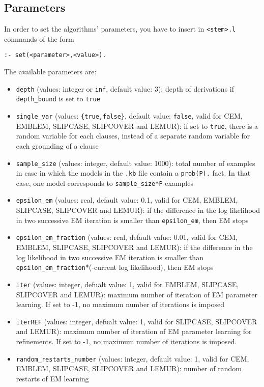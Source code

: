\documentclass[a4paper,10pt]{scrartcl}
\begin{document}
\subsection{Parameters}
In order to set the algorithms' parameters, you have to insert in \texttt{<stem>.l}  commands of the form
\begin{verbatim}
:- set(<parameter>,<value>).
\end{verbatim}
The available parameters are:
\begin{itemize}
\item \verb|depth| (values: integer or \verb|inf|, default value: 3): depth of derivations if  \verb|depth_bound|  is set to \verb|true|
\item \verb|single_var| (values: \verb|{true,false}|, default value: \verb|false|, valid for CEM, EMBLEM, SLIPCASE, SLIPCOVER and LEMUR): if set to \verb|true|, there is a random variable for each clauses, instead of a separate random variable for each grounding of a clause
\item \verb|sample_size| (values: integer, default value: 1000): total number of examples in case in which the models in the \verb|.kb| file contain a \verb|prob(P).| fact. In that case, one model corresponds to \verb|sample_size*P| examples
\item \verb|epsilon_em| (values: real, default value: 0.1, valid for CEM, 
EMBLEM, SLIPCASE, SLIPCOVER and LEMUR): if the difference in the log likelihood in two successive EM iteration is smaller
than \verb|epsilon_em|, then EM stops 
\item \verb|epsilon_em_fraction| (values: real, default value: 0.01, valid for 
CEM, EMBLEM, SLIPCASE, SLIPCOVER and LEMUR): if the difference in the log likelihood in two successive EM iteration is smaller
than \verb|epsilon_em_fraction|*(-current log likelihood), then EM stops
\item \verb|iter| (values: integer, defualt value: 1, valid for EMBLEM, 
SLIPCASE, SLIPCOVER and LEMUR): maximum number of iteration of EM parameter learning. If set to -1, no maximum number of iterations is imposed
\item \verb|iterREF| (values: integer, defualt value: 1, valid for  SLIPCASE,
 SLIPCOVER and LEMUR):
 maximum number of iteration of EM parameter learning for refinements. If set to -1, no maximum number of iterations is imposed.
\item \verb|random_restarts_number| (values: integer, default value: 1, valid for CEM, EMBLEM, SLIPCASE, SLIPCOVER and LEMUR): number of random restarts of EM learning

\end{itemize}
\end{document}
